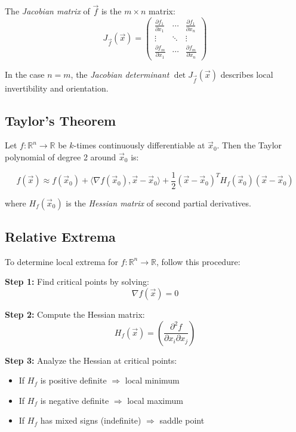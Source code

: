 The \emph{Jacobian matrix} of \( \vec{f} \) is the \( m \times n \) matrix:
\[
J_{\vec{f}}(\vec{x}) = \begin{pmatrix}
\frac{\partial f_1}{\partial x_1} & \cdots & \frac{\partial f_1}{\partial x_n} \\
\vdots & \ddots & \vdots \\
\frac{\partial f_m}{\partial x_1} & \cdots & \frac{\partial f_m}{\partial x_n}
\end{pmatrix}
\]

In the case \( n = m \), the \emph{Jacobian determinant} \( \det J_{\vec{f}}(\vec{x}) \) 
describes local invertibility and orientation.


\subsection{Taylor's Theorem}

Let \( f : \mathbb{R}^n \to \mathbb{R} \) be \( k \)-times continuously differentiable at \( \vec{x}_0 \). Then the Taylor polynomial of degree 2 around \( \vec{x}_0 \) is:

\[
f(\vec{x}) \approx f(\vec{x}_0) + \langle \nabla f(\vec{x}_0), \vec{x} - \vec{x}_0 \rangle + \frac{1}{2} {(\vec{x} - \vec{x}_0)}^T H_f(\vec{x}_0)(\vec{x} - \vec{x}_0)
\]

where \( H_f(\vec{x}_0) \) is the \emph{Hessian matrix} of second partial derivatives.


\subsection{Relative Extrema}

To determine local extrema for \( f : \mathbb{R}^n \to \mathbb{R} \), follow this procedure:

\textbf{Step 1:} Find critical points by solving:
\[
\nabla f(\vec{x}) = 0
\]

\textbf{Step 2:} Compute the Hessian matrix:
\[
H_f(\vec{x}) = \left( \frac{\partial^2 f}{\partial x_i \partial x_j} \right)
\]

\textbf{Step 3:} Analyze the Hessian at critical points:
\begin{itemize}[label=\(-\)]
\item If \( H_f \) is positive definite \( \Rightarrow \) local minimum
\item If \( H_f \) is negative definite \( \Rightarrow \) local maximum
\item If \( H_f \) has mixed signs (indefinite) \( \Rightarrow \) saddle point
\end{itemize}

